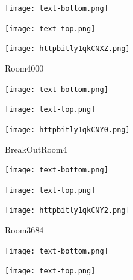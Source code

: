 \documentclass[letterpaper]{article}
\begin{document}
 \centerline{\texttt{[image: text-bottom.png]}} 
 
 \pagebreak 
{} 
 \vspace*{\fill} 
 
  \centerline{\texttt{[image: text-top.png]}} 
 
 \vspace{0.5in} 
 
 \begingroup 
 \centerline{\texttt{[image: httpbitly1qkCNXZ.png]}} 
 \endgroup 
 \vspace*{\fill} 

 \hfill{\small Room4000} 

  \vspace{0.7in} 
 
 \centerline{\texttt{[image: text-bottom.png]}} 
 
 \pagebreak 
{} 
 \vspace*{\fill} 
 
  \centerline{\texttt{[image: text-top.png]}} 
 
 \vspace{0.5in} 
 
 \begingroup 
 \centerline{\texttt{[image: httpbitly1qkCNY0.png]}} 
 \endgroup 
 \vspace*{\fill} 

 \hfill{\small BreakOutRoom4} 

  \vspace{0.7in} 
 
 \centerline{\texttt{[image: text-bottom.png]}} 
 
 \pagebreak 
{} 
 \vspace*{\fill} 
 
  \centerline{\texttt{[image: text-top.png]}} 
 
 \vspace{0.5in} 
 
 \begingroup 
 \centerline{\texttt{[image: httpbitly1qkCNY2.png]}} 
 \endgroup 
 \vspace*{\fill} 

 \hfill{\small Room3684} 

  \vspace{0.7in} 
 
 \centerline{\texttt{[image: text-bottom.png]}} 
 
 \pagebreak 
{} 
 \vspace*{\fill} 
 
  \centerline{\texttt{[image: text-top.png]}} 
 
 \vspace{0.5in} 
 
\end{document}
